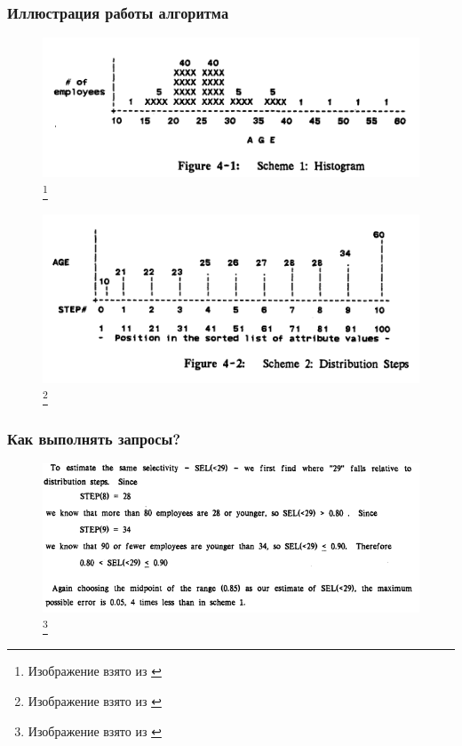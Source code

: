 \documentclass{beamer}
\begin{document}
\begin{frame}
\frametitle{Иллюстрация работы алгоритма}

\begin{figure}[htb]
\includegraphics[width=\textwidth,height=0.35\textheight,keepaspectratio]{shapiro-1.png} 
\footnote{\tiny{Изображение взято из \cite{Piatetsky-Shapiro1984}}}
\end{figure}

\begin{figure}[htb]
\includegraphics[width=\textwidth,height=0.36\textheight,keepaspectratio]{shapiro-2.png} 
\footnote{\tiny{Изображение взято из \cite{Piatetsky-Shapiro1984}}}
\end{figure}

\end{frame}


\begin{frame}
\frametitle{Как выполнять запросы?}

\begin{figure}[htb]
\includegraphics[width=\textwidth,height=0.65\textheight,keepaspectratio]{shapiro-3.png} 
\footnote{\tiny{Изображение взято из \cite{Piatetsky-Shapiro1984}}}
\end{figure}

\end{frame}
\end{document}
